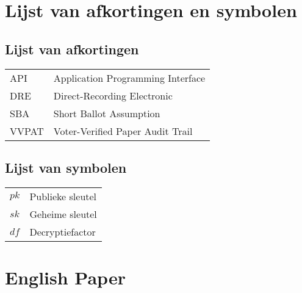 \documentclass[master=elt,masteroption=im,inputenc=utf8]{kulemt}
\begin{document}
  
  

  \begin{preface}
    
  \end{preface}

  \kulemtmanToC
  \tableofcontents

  \begin{abstract}
    
  \end{abstract}
  
  \listoffiguresandtables
  
  \chapter{Lijst van afkortingen en symbolen}
  \section*{Lijst van afkortingen}
  \begin{flushleft}
    \renewcommand{\arraystretch}{1.1}
    \begin{tabularx}{\textwidth}{@{}p{14mm}X@{}}
      API & Application Programming Interface \\
      DRE & Direct-Recording Electronic \\
      SBA & Short Ballot Assumption \\
      VVPAT & Voter-Verified Paper Audit Trail
    \end{tabularx}
  \end{flushleft}
  \section*{Lijst van symbolen}
  \begin{flushleft}
    \renewcommand{\arraystretch}{1.1}
    \begin{tabularx}{\textwidth}{@{}p{14mm}X@{}}
      $pk$ & Publieke sleutel \\
      $sk$ & Geheime sleutel \\
      $df$ & Decryptiefactor
    \end{tabularx}
  \end{flushleft}

  \mainmatter

  
  
  
  
  
  
  
  
  
  

  \appendix
  
  \chapter{English Paper}
  

  \backmatter

  \nocite{*}

  
  
\end{document}
